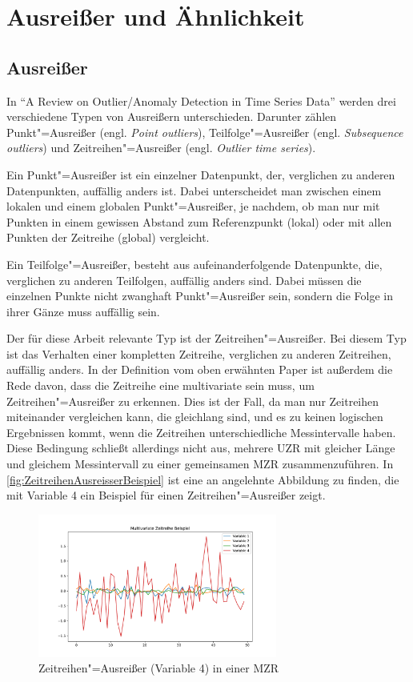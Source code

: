 \section{Ausreißer und Ähnlichkeit}
\subsection{Ausreißer}
In "`A Review on Outlier/Anomaly Detection in Time Series Data"' \cite[Ch. 2.2]{reviewOutlierDetection} werden drei verschiedene Typen von Ausreißern unterschieden. Darunter zählen Punkt"=Ausreißer (engl. \textit{Point outliers}), Teilfolge"=Ausreißer (engl. \textit{Subsequence outliers}) und Zeitreihen"=Ausreißer (engl. \textit{Outlier time series}).

Ein Punkt"=Ausreißer ist ein einzelner Datenpunkt, der, verglichen zu anderen Datenpunkten, auffällig anders ist. Dabei unterscheidet man zwischen einem lokalen und einem globalen Punkt"=Ausreißer, je nachdem, ob man nur mit Punkten in einem gewissen Abstand zum Referenzpunkt (lokal) oder mit allen Punkten der Zeitreihe (global) vergleicht.

Ein Teilfolge"=Ausreißer, besteht aus aufeinanderfolgende Datenpunkte, die, verglichen zu anderen Teilfolgen, auffällig anders sind. Dabei müssen die einzelnen Punkte nicht zwanghaft Punkt"=Ausreißer sein, sondern die Folge in ihrer Gänze muss auffällig sein. 

Der für diese Arbeit relevante Typ ist der Zeitreihen"=Ausreißer. Bei diesem Typ ist das Verhalten einer kompletten Zeitreihe, verglichen zu anderen Zeitreihen, auffällig anders. In der Definition vom oben erwähnten Paper \cite{reviewOutlierDetection} ist außerdem die Rede davon, dass die Zeitreihe eine multivariate sein muss, um Zeitreihen"=Ausreißer zu erkennen. Dies ist der Fall, da man nur Zeitreihen miteinander vergleichen kann, die gleichlang sind, und es zu keinen logischen Ergebnissen kommt, wenn die Zeitreihen unterschiedliche Messintervalle haben. Diese Bedingung schließt allerdings nicht aus, mehrere \acs{UZR} mit gleicher Länge und gleichem Messintervall zu einer gemeinsamen \acs{MZR} zusammenzuführen. In \autoref{fig:ZeitreihenAusreisserBeispiel} ist eine an \cite[Fig. 5]{reviewOutlierDetection} angelehnte Abbildung zu finden, die mit Variable 4 ein Beispiel für einen Zeitreihen"=Ausreißer zeigt.
\begin{figure}[bth] 
  \centering
  \includegraphics[width=0.7\textwidth]{Graphics/TimeSeriesOutlierExample.pdf}
  \caption{Zeitreihen"=Ausreißer (Variable 4) in einer \acs{MZR}}
  \label{fig:ZeitreihenAusreisserBeispiel}
\end{figure}

